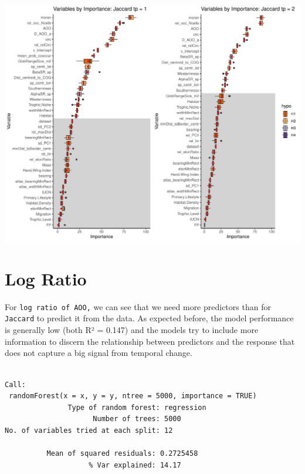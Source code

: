 \documentclass[
  letterpaper,
  DIV=11,
  numbers=noendperiod]{scrreprt}
\newenvironment{Shaded}{\begin{snugshade}}{\end{snugshade}}
\newcommand{\CommentTok}[1]{\textcolor[rgb]{0.37,0.37,0.37}{#1}}
\newcommand{\DecValTok}[1]{\textcolor[rgb]{0.68,0.00,0.00}{#1}}
\newcommand{\NormalTok}[1]{\textcolor[rgb]{0.00,0.23,0.31}{#1}}
\newcommand{\SpecialCharTok}[1]{\textcolor[rgb]{0.37,0.37,0.37}{#1}}
\begin{document}
\includegraphics{02_rfe_files/figure-pdf/rfe-results-boxplot-j-3.pdf}

\section{Log Ratio}

For \texttt{log\ ratio\ of\ AOO,} we can see that we need more
predictors than for \texttt{Jaccard} to predict it from the data. As
expected before, the model performance is generally low (both R² =
0.147) and the models try to include more information to discern the
relationship between predictors and the response that does not capture a
big signal from temporal change.

\begin{Shaded}
\end{Shaded}

\begin{verbatim}

Call:
 randomForest(x = x, y = y, ntree = 5000, importance = TRUE) 
               Type of random forest: regression
                     Number of trees: 5000
No. of variables tried at each split: 12

          Mean of squared residuals: 0.2725458
                    % Var explained: 14.17
\end{verbatim}
\end{document}
